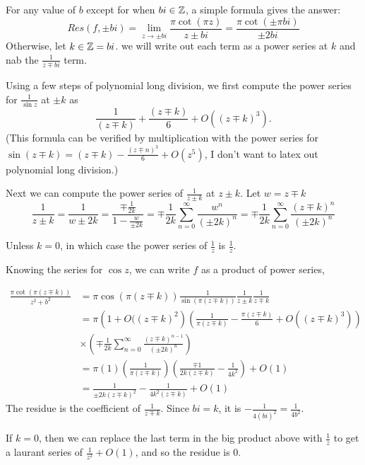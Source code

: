 \documentclass{homework}
\begin{document}
                        \begin{solution}
                        For any value of $b$ except for when $bi\in \mathbb{Z}$, a simple formula gives the answer:
                        \[
                        Res(f, \pm bi) = \lim_{z\to \pm bi}\frac{\pi \cot(\pi z)}{z \pm bi} =\frac{\pi \cot(\pm \pi bi)}{\pm2bi}
                        \]
                        Otherwise, let $k\in \mathbb{Z} = bi$. 
                        we will write out each term as a power series at $k$ and nab the $\frac{1}{z\mp bi}$ term.

                        Using a few steps of polynomial long division, we first compute the power series for $\frac{1}{\sin z}$ at $\pm k$ as 
                        \[\frac{1}{(z\mp k)} + \frac{(z\mp k)}{6} + O((z\mp k)^3).\]
                        (This formula can be verified by multiplication with the power series for $\sin (z\mp k) = (z\mp k) - \frac{(z\mp n)^3}{6} + O(z^5)$, I don't want to latex out polynomial long division.)

                        Next we can compute the power series of $\frac{1}{z\pm k}$ at $z\pm k$. Let $w=z\mp k$
                        \[
                        \frac{1}{z\pm k} = \frac{1}{w\pm 2k} = \frac{\mp\frac{1}{2k}}{1-\frac{w}{\pm 2k}}= \mp \frac{1}{2k}\sum_{n=0}^\infty \frac{w^n}{(\pm 2k)^n} = \mp \frac{1}{2k}\sum_{n=0}^\infty \frac{(z\mp k)^n}{(\pm 2k)^n}
                        \]

                        Unless $k=0$, in which case the power series of $\frac{1}{z}$ is $\frac{1}{z}$.

                        Knowing the series for $\cos z$, we can write $f$ as a product of power series,

                        \begin{align*}
                        \frac{\pi\cot(\pi (z\mp k))}{z^2 + b^2} &= \pi\cos(\pi (z\mp k))\frac{1}{\sin(\pi (z\mp k))}\frac{1}{z\pm k}\frac{1}{z\mp k} \\
                        &= \pi\left(1 + O((z\mp k)^2\right)\left(\frac{1}{\pi(z\mp k)} - \frac{\pi(z\mp k)}{6} + O((z\mp k)^3)\right)\\&\times \left(\mp\frac{1}{2k}\sum_{n=0}^\infty \frac{(z\mp k)^{n-1}}{(\pm 2k)^{n}}\right) \\
                        &= \pi(1)\left(\frac{1}{\pi(z\mp k)}\right)\left(\frac{\mp 1}{2k(z\mp k)} - \frac{1}{4k^2}\right) + O(1)\\
                        &= \frac{1}{\pm 2k (z\mp k)^2} - \frac{1}{4k^2(z\mp k)}+ O(1)
                        \end{align*}
                        The residue is the coefficient of $\frac{1}{z\mp k}$. Since $bi=k$, it is  $-\frac{1}{4(bi)^2}=\frac{1}{4b^2}$.

                        If $k=0$, then we can replace the last term in the big product above with $\frac{1}{z}$ to get a laurant series of $\frac{1}{z^2} + O(1)$, and so the residue is 0.
                        \end{solution}
\end{document}
